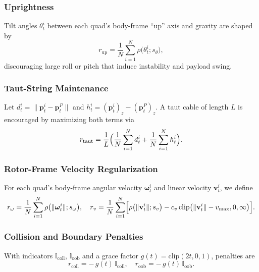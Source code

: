 \subsubsection{Uprightness}
Tilt angles \(\theta^i_t\) between each quad's body-frame “up” axis and gravity are shaped by
\[
r_{\mathrm{up}}
= \frac{1}{N}\sum_{i=1}^N \rho\bigl(\theta^i_t; s_\theta\bigr),
\]
discouraging large roll or pitch that induce instability and payload swing.

\subsubsection{Taut-String Maintenance}
Let \(d^i_t=\lVert\mathbf{p}^i_t-\mathbf{p}^P_t\rVert\) and \(h^i_t=(\mathbf{p}^i_t)_z-(\mathbf{p}^P_t)_z\).  A taut cable of length \(L\) is encouraged by maximizing both terms via
\[
r_{\mathrm{taut}}
= \frac{1}{L}\Bigl(\frac{1}{N}\sum_{i=1}^N d^i_t + \frac{1}{N}\sum_{i=1}^N h^i_t\Bigr).
\]

\subsubsection{Rotor-Frame Velocity Regularization}
For each quad's body-frame angular velocity \(\boldsymbol{\omega}^i_t\) and linear velocity \(\mathbf{v}^i_t\), we define
\[
r_{\omega}
= \frac{1}{N}\sum_{i=1}^N \rho\bigl(\lVert\boldsymbol{\omega}^i_t\rVert; s_\omega\bigr),
\quad
r_{v}
= \frac{1}{N}\sum_{i=1}^N \Bigl[\rho\bigl(\lVert\mathbf{v}^i_t\rVert; s_v\bigr)
- c_v\,\mathrm{clip}\bigl(\lVert\mathbf{v}^i_t\rVert - v_{\max},0,\infty\bigr)\Bigr].
\]

\subsubsection{Collision and Boundary Penalties}
With indicators \(\mathbb{I}_{\mathrm{coll}}\), \(\mathbb{I}_{\mathrm{oob}}\) and a grace factor \(g(t)=\mathrm{clip}(2t,0,1)\), penalties are
\[
r_{\mathrm{coll}} = -\,g(t)\,\mathbb{I}_{\mathrm{coll}}, 
\quad
r_{\mathrm{oob}} = -\,g(t)\,\mathbb{I}_{\mathrm{oob}}.
\]

